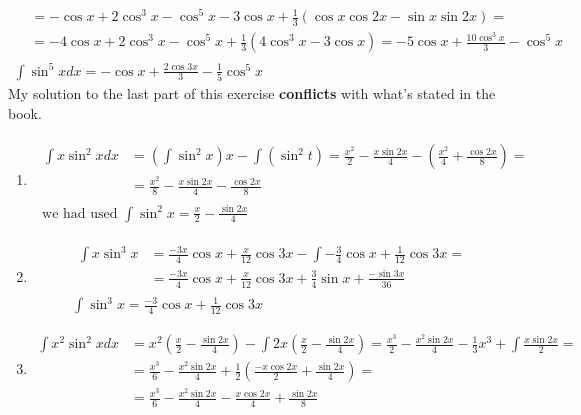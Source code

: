 \documentclass[twoside]{amsart}
\theoremstyle{plain}
\theoremstyle{definition}
\newcommand{\exercisehead}[1]
  {\smallskip
   \noindent{\small\bf Exercise #1.}}
\begin{document}
\begin{enumerate}
\[\begin{gathered}
\begin{aligned}
    & = -\cos{x} + 2 \cos^3{x} - \cos^5{x} - 3\cos{x} + \frac{1}{3} (\cos{x} \cos{2x} - \sin{x} \sin{2x} ) = \\
    & = -4 \cos{x} + 2 \cos^3{x} - \cos^5{x} + \frac{1}{3} (4 \cos^3{x} - 3 \cos{x} ) = -5 \cos{x} + \frac{ 10 \cos^3{x}}{ 3 } - \cos^5{x} 
\end{aligned} \\
  \int \sin^5{x} dx = - \cos{x} + \frac{2 \cos{3x}}{ 3 } - \frac{1}{5} \cos^5{x} 
\end{gathered}
\]
My solution to the last part of this exercise \textbf{ conflicts } with what's stated in the book.  
\end{enumerate}

\exercisehead{11} 
\begin{enumerate}
\item 
\[
\begin{gathered}
\begin{aligned}
  \int x \sin^2{x} dx & = ( \int \sin^2{x} )x - \int (\sin^2{t}) = \frac{x^2}{2} - \frac{ x \sin{2x}}{ 4 } - \left( \frac{x^2}{4} + \frac{ \cos{2x}}{8} \right) = \\
 & =   \frac{x^2}{8} - \frac{ x \sin{2x}}{4}  - \frac{ \cos{2x}}{8} 
\end{aligned} \\
\text{ we had used } \int \sin^2{x} = \frac{x}{2} - \frac{ \sin{2x}}{4} 
\end{gathered}
\]
\item 
\[
\begin{gathered}
\begin{aligned}
  \int x \sin^3{x} & = \frac{-3x}{4} \cos{x} + \frac{x}{12} \cos{3x} - \int -\frac{3}{4} \cos{x} + \frac{1}{12} \cos{3x} = \\
& = \frac{-3x}{4} \cos{x} + \frac{x}{12} \cos{3x} + \frac{3}{4} \sin{x} + \frac{-\sin{3x}}{36} 
\end{aligned} \\
\int \sin^3{x} = \frac{-3}{4} \cos{x} + \frac{1}{12} \cos{3x} 
\end{gathered}
\]
\item \[
\begin{aligned}
  \int x^2 \sin^2{x} dx & = x^2 \left( \frac{x}{2} - \frac{\sin{2x}}{4} \right) - \int 2x \left( \frac{x}{2} - \frac{ \sin{2x} }{4} \right) = \frac{x^3}{2} - \frac{ x^2 \sin{2x}}{4} - \frac{1}{3} x^3 + \int \frac{x \sin{2x}}{2} = \\
  & = \frac{x^3}{6} - \frac{ x^2 \sin{2x}}{ 4 } + \frac{1}{2} \left( \frac{ -x \cos{2x}}{2} + \frac{ \sin{2x}}{4} \right) = \\
  & = \boxed{ \frac{x^3}{6} - \frac{x^2 \sin{2x}}{ 4 } -  \frac{ x \cos{2x}}{4 } + \frac{ \sin{2x}}{8 } }
\end{aligned}
\]
\end{enumerate}
\end{document}
